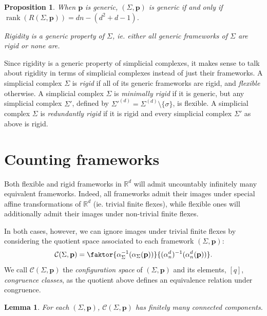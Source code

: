 \documentclass[11pt]{amsart}
\newtheorem{proposition}[theorem]{Proposition}
\newtheorem{lemma}[theorem]{Lemma}
\theoremstyle{definition}
\theoremstyle{remark}
\DeclareMathOperator{\rank}{rank}
\newcommand*{\defn}[1]{{\color{purple}\textit{#1}}}
\begin{document}
\begin{proposition}\cite{borcea2012realizations}\cite[p. 50]{southgate2024volume}
When $\mathbf{p}$ is generic, $(\Sigma,\mathbf{p})$ is generic if and only if $\rank(R(\Sigma,\mathbf{p}))=dn-(d^2+d-1)$.

Rigidity is a generic property of $\Sigma$, ie. either all generic frameworks of $\Sigma$ are rigid or none are.
\end{proposition}

Since rigidity is a generic property of simplicial complexes, it makes sense to talk about rigidity in terms of simplicial complexes instead of just their frameworks.
A simplicial complex $\Sigma$ is \defn{rigid} if all of its generic frameworks are rigid, and \defn{flexible} otherwise.
A simplicial complex $\Sigma$ is \defn{minimally rigid} if it is generic, but any simplicial complex $\Sigma'$, defined by $\Sigma'^{(d)}=\Sigma^{(d)}\setminus\{\sigma\}$, is flexible.
A simplicial complex $\Sigma$ is \defn{redundantly rigid} if it is rigid and every simplicial complex $\Sigma'$ as above is rigid.

\section{Counting frameworks}

Both flexible and rigid frameworks in $\mathbb{R}^d$ will admit uncountably infinitely many equivalent frameworks.
Indeed, all frameworks admit their images under special affine transformations of $\mathbb{R}^d$ (ie. trivial finite flexes), while flexible ones will additionally admit their images under non-trivial finite flexes.

In both cases, however, we can ignore images under trivial finite flexes by considering the quotient space associated to each framework $(\Sigma,\mathbf{p})$:
\begin{equation*}
    \mathcal{C}(\Sigma,\mathbf{p}) = \faktor{\alpha_{\Sigma}^{-1}(\alpha_{\Sigma}(\mathbf{p}))}{(\alpha_n^d)^{-1}(\alpha_n^d(\mathbf{p}))}.
\end{equation*}
We call $\mathcal{C}(\Sigma,\mathbf{p})$ the \defn{configuration space} of $(\Sigma,\mathbf{p})$ and its elements, $[q]$, \defn{congruence classes}, as the quotient above defines an equivalence relation under congruence.

\begin{lemma}
    For each $(\Sigma,\mathbf{p})$, $\mathcal{C}(\Sigma,\mathbf{p})$ has finitely many connected components.
\end{lemma}
\end{document}
